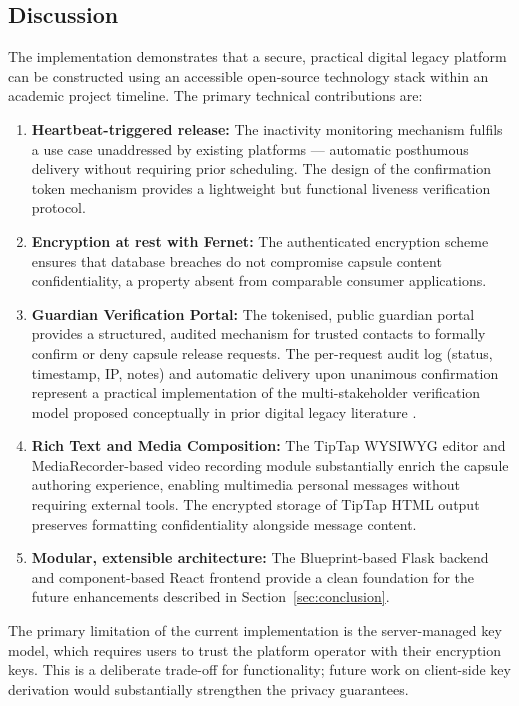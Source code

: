 \documentclass[12pt, a4paper]{article}
\begin{document}
\subsection{Discussion}

The implementation demonstrates that a secure, practical digital legacy platform can be constructed using an accessible open-source technology stack within an academic project timeline. The primary technical contributions are:

\begin{enumerate}
  \item \textbf{Heartbeat-triggered release:} The inactivity monitoring mechanism fulfils a use case unaddressed by existing platforms — automatic posthumous delivery without requiring prior scheduling. The design of the confirmation token mechanism provides a lightweight but functional liveness verification protocol.
  \item \textbf{Encryption at rest with Fernet:} The authenticated encryption scheme ensures that database breaches do not compromise capsule content confidentiality, a property absent from comparable consumer applications.
  \item \textbf{Guardian Verification Portal:} The tokenised, public guardian portal provides a structured, audited mechanism for trusted contacts to formally confirm or deny capsule release requests. The per-request audit log (status, timestamp, IP, notes) and automatic delivery upon unanimous confirmation represent a practical implementation of the multi-stakeholder verification model proposed conceptually in prior digital legacy literature \cite{maciel2021}.
  \item \textbf{Rich Text and Media Composition:} The TipTap WYSIWYG editor and MediaRecorder-based video recording module substantially enrich the capsule authoring experience, enabling multimedia personal messages without requiring external tools. The encrypted storage of TipTap HTML output preserves formatting confidentiality alongside message content.
  \item \textbf{Modular, extensible architecture:} The Blueprint-based Flask backend and component-based React frontend provide a clean foundation for the future enhancements described in Section~\ref{sec:conclusion}.
\end{enumerate}

The primary limitation of the current implementation is the server-managed key model, which requires users to trust the platform operator with their encryption keys. This is a deliberate trade-off for functionality; future work on client-side key derivation would substantially strengthen the privacy guarantees.
\end{document}
